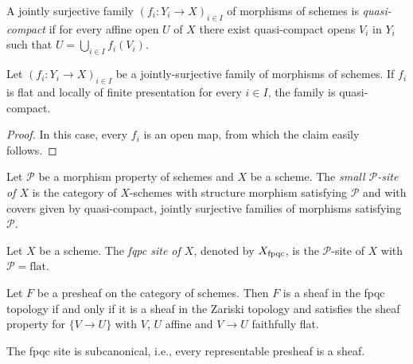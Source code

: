 \begin{definition}
    A jointly surjective family $(f_i \colon Y_i \to X)_{i \in I}$ of morphisms of schemes is
    \emph{quasi-compact} if for
    every affine open $U$ of $X$ there exist quasi-compact opens $V_i$ in $Y_i$ such that
    $U = \bigcup_{i \in  I} f_i(V_i)$.
    \leanok
    \label{def:qc-cover}
\end{definition}

\begin{lemma}
    Let $(f_i \colon Y_i \to X)_{i \in I}$ be a jointly-surjective family of morphisms of schemes.
    If $f_i$ is flat and locally of finite presentation for every $i \in I$,
    the family is quasi-compact.
    \label{lemma:qc-cover-of-flat-fp}
\end{lemma}

\begin{proof}
    In this case, every $f_i$ is an open map, from which the claim easily follows.
\end{proof}

\begin{definition}
    Let $\mathcal{P}$ be a morphism property of schemes and $X$ be a scheme.
    The \emph{small $\mathcal{P}$-site of $X$} is the category of $X$-schemes with
    structure morphism satisfying $\mathcal{P}$ and with covers given by quasi-compact,
    jointly surjective families of morphisms satisfying $\mathcal{P}$.
    \label{def:small-P-site}
\end{definition}

\begin{definition}
    Let $X$ be a scheme. The \emph{fqpc site of $X$}, denoted by $X_{\mathrm{fpqc}}$, is the
    $\mathcal{P}$-site of $X$ with $\mathcal{P} = \text{flat}$.
    \label{def:fpqc-site}
\end{definition}

\begin{proposition}
    Let $F$ be a presheaf on the category of schemes. Then $F$ is a sheaf in the
    fpqc topology if and only if it is a sheaf in the Zariski topology and satisfies
    the sheaf property for $\{V \to U\}$ with $V$, $U$ affine
    and $V \to U$ faithfully flat.
    \label{prop:fpqc-sheaf-iff}
\end{proposition}

\begin{theorem}
    The fpqc site is subcanonical, i.e., every representable presheaf is a sheaf.
    \label{thm:fpqc-subcanonical}
\end{theorem}

